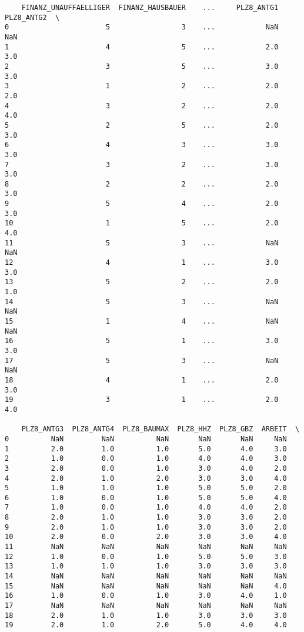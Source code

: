 \documentclass[11pt]{article}
\begin{document}
\begin{verbatim}
    FINANZ_UNAUFFAELLIGER  FINANZ_HAUSBAUER    ...     PLZ8_ANTG1  PLZ8_ANTG2  \
0                       5                 3    ...            NaN         NaN   
1                       4                 5    ...            2.0         3.0   
2                       3                 5    ...            3.0         3.0   
3                       1                 2    ...            2.0         2.0   
4                       3                 2    ...            2.0         4.0   
5                       2                 5    ...            2.0         3.0   
6                       4                 3    ...            3.0         3.0   
7                       3                 2    ...            3.0         3.0   
8                       2                 2    ...            2.0         3.0   
9                       5                 4    ...            2.0         3.0   
10                      1                 5    ...            2.0         4.0   
11                      5                 3    ...            NaN         NaN   
12                      4                 1    ...            3.0         3.0   
13                      5                 2    ...            2.0         1.0   
14                      5                 3    ...            NaN         NaN   
15                      1                 4    ...            NaN         NaN   
16                      5                 1    ...            3.0         3.0   
17                      5                 3    ...            NaN         NaN   
18                      4                 1    ...            2.0         3.0   
19                      3                 1    ...            2.0         4.0   

    PLZ8_ANTG3  PLZ8_ANTG4  PLZ8_BAUMAX  PLZ8_HHZ  PLZ8_GBZ  ARBEIT  \
0          NaN         NaN          NaN       NaN       NaN     NaN   
1          2.0         1.0          1.0       5.0       4.0     3.0   
2          1.0         0.0          1.0       4.0       4.0     3.0   
3          2.0         0.0          1.0       3.0       4.0     2.0   
4          2.0         1.0          2.0       3.0       3.0     4.0   
5          1.0         1.0          1.0       5.0       5.0     2.0   
6          1.0         0.0          1.0       5.0       5.0     4.0   
7          1.0         0.0          1.0       4.0       4.0     2.0   
8          2.0         1.0          1.0       3.0       3.0     2.0   
9          2.0         1.0          1.0       3.0       3.0     2.0   
10         2.0         0.0          2.0       3.0       3.0     4.0   
11         NaN         NaN          NaN       NaN       NaN     NaN   
12         1.0         0.0          1.0       5.0       5.0     3.0   
13         1.0         1.0          1.0       3.0       3.0     3.0   
14         NaN         NaN          NaN       NaN       NaN     NaN   
15         NaN         NaN          NaN       NaN       NaN     4.0   
16         1.0         0.0          1.0       3.0       4.0     1.0   
17         NaN         NaN          NaN       NaN       NaN     NaN   
18         2.0         1.0          1.0       3.0       3.0     3.0   
19         2.0         1.0          2.0       5.0       4.0     4.0   


\end{verbatim}
\end{document}
